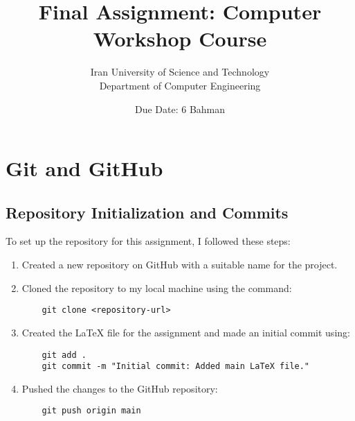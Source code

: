\documentclass[12pt,a4paper]{article}
\title{Final Assignment: Computer Workshop Course}
\author{Iran University of Science and Technology \\ Department of Computer Engineering}
\date{Due Date: 6 Bahman}
\begin{document}
\maketitle
\tableofcontents
\newpage

\section{Git and GitHub}

\subsection{Repository Initialization and Commits}
To set up the repository for this assignment, I followed these steps:
\begin{enumerate}
    \item Created a new repository on GitHub with a suitable name for the project.
    \item Cloned the repository to my local machine using the command:
    \begin{verbatim}
    git clone <repository-url>
    \end{verbatim}
    \item Created the LaTeX file for the assignment and made an initial commit using:
    \begin{verbatim}
    git add .
    git commit -m "Initial commit: Added main LaTeX file."
    \end{verbatim}
    \item Pushed the changes to the GitHub repository:
    \begin{verbatim}
    git push origin main
    \end{verbatim}
\end{enumerate}
\end{document}

